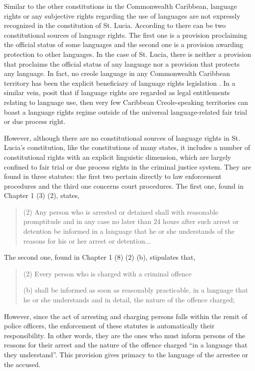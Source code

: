 \documentclass[output=paper,colorlinks,citecolor=brown]{langscibook}
\begin{document}
Similar to the other constitutions in the Commonwealth Caribbean, language rights or any subjective rights regarding the use of languages are not expressly recognized in the constitution of St. Lucia. According to \citet{Arzoz2007} there can be two constitutional sources of language rights. The first one is a provision proclaiming the official status of some languages and the second one is a provision awarding protection to other languages. In the case of St. Lucia, there is neither a provision that proclaims the official status of any language nor a provision that protects any language. In fact, no creole language in any Commonwealth Caribbean territory has been the explicit beneficiary of language rights legislation \citep{BrownBlake2014}. In a similar vein,  \citet[4]{Brown-Blake_Devonish2012} posit that if language rights are regarded as legal entitlements relating to language use, then very few Caribbean Creole-speaking territories can boast a language rights regime outside of the universal language-related fair trial or due process right.

However, although there are no constitutional sources of language rights in St. Lucia’s constitution,  like the constitutions of many states, it includes a number of constitutional rights with an explicit linguistic dimension, which are largely confined to fair trial or due process rights in the criminal justice system. They are found in three statutes: the first two pertain directly to law enforcement procedures and the third one concerns court procedures. The first one, found in  Chapter 1 (3) (2), states,  

\begin{quote}
    (2) Any person who is arrested or detained shall with reasonable promptitude and in any case no later than 24 hours after such arrest or detention be informed in a language that he or she understands of the reasons for his or her arrest or detention...
\end{quote}

The second one, found in Chapter 1 (8) (2) (b), stipulates that,

\begin{quote}
    (2) Every person who is charged with a criminal offence 
    
    (b) shall be informed as soon as reasonably practicable, in a language that he or she understands and in detail, the nature of the offence charged; 
\end{quote}

However, since the act of arresting and charging persons falls within the remit of police officers, the enforcement of these statutes is automatically their responsibility. In other words, they are the ones who must inform persons of the reasons for their arrest and the nature of the offence charged “in a language that they understand”. This provision gives primacy to the language of the arrestee or the accused. 
\end{document}
